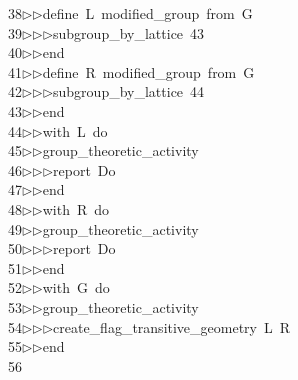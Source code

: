 \begin{tabbing}
38\>$\triangleright$\>$\triangleright$\>define\ L\ modified\_group\ from\ G\ \\[0pt]
39\>$\triangleright$\>$\triangleright$\>$\triangleright$\>subgroup\_by\_lattice\ 43\ \\[0pt]
40\>$\triangleright$\>$\triangleright$\>end\ \\[0pt]
41\>$\triangleright$\>$\triangleright$\>define\ R\ modified\_group\ from\ G\ \\[0pt]
42\>$\triangleright$\>$\triangleright$\>$\triangleright$\>subgroup\_by\_lattice\ 44\ \\[0pt]
43\>$\triangleright$\>$\triangleright$\>end\ \\[0pt]
44\>$\triangleright$\>$\triangleright$\>with\ L\ do\ \\[0pt]
45\>$\triangleright$\>$\triangleright$\>group\_theoretic\_activity\ \\[0pt]
46\>$\triangleright$\>$\triangleright$\>$\triangleright$\>report\ Do\ \\[0pt]
47\>$\triangleright$\>$\triangleright$\>end\ \\[0pt]
48\>$\triangleright$\>$\triangleright$\>with\ R\ do\ \\[0pt]
49\>$\triangleright$\>$\triangleright$\>group\_theoretic\_activity\ \\[0pt]
50\>$\triangleright$\>$\triangleright$\>$\triangleright$\>report\ Do\ \\[0pt]
51\>$\triangleright$\>$\triangleright$\>end\ \\[0pt]
52\>$\triangleright$\>$\triangleright$\>with\ G\ do\ \\[0pt]
53\>$\triangleright$\>$\triangleright$\>group\_theoretic\_activity\ \\[0pt]
54\>$\triangleright$\>$\triangleright$\>$\triangleright$\>create\_flag\_transitive\_geometry\ L\ R\ \\[0pt]
55\>$\triangleright$\>$\triangleright$\>end\\[0pt]
56\>\end{tabbing}
